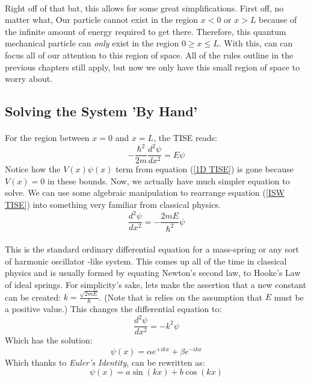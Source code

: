 \documentclass[12pt,letterpaper]{book}
\begin{document}
\paragraph*{}Right off of that bat, this allows for some great simplifications. First off, no matter what, Our particle cannot exist in the region $x < 0$ or $x > L$ because of the infinite amount of energy required to get there. Therefore, this quantum mechanical particle can \textit{only} exist in the region $0 \geq x \leq L$. With this, can can focus all of our attention to this region of space. All of the rules outline in the previous chapters still apply, but now we only have this small region of space to worry about.


\subsection*{Solving the System 'By Hand'}

\paragraph*{}For the region between $x = 0$ and $x = L$, the TISE reads:
\begin{equation}
\label{ISW TISE}
-\frac{\hbar^2}{2m}\frac{d^2 \psi}{dx^2} = E\psi
\end{equation}
Notice how the $V(x)\psi(x)$ term from equation (\ref{1D TISE}) is gone because $V(x) = 0$ in these bounds. Now, we actually have much simpler equation to solve. We can use some algebraic manipulation to rearrange equation (\ref{ISW TISE}) into something very familiar from classical physics.
\begin{equation}
\label{HO ODE}
\frac{d^2 \psi}{dx^2} = -\frac{2mE}{\hbar^2}\psi
\end{equation}
\paragraph{}This is the standard ordinary differential equation for a mass-spring or any sort of harmonic oscillator -like system. This comes up all of the time in classical physics and is usually formed by equating Newton's second law, to Hooke's Law of ideal springs.  For simplicity's sake, lets make the assertion that a new constant can be created: $k = \frac{\sqrt{2mE}}{\hbar}$. (Note that is relies on the assumption that $E$ must be a positive value.) This changes the differential equation to:
\begin{equation}
\frac{d^2 \psi}{dx^2} = -k^2\psi
\end{equation}
Which has the solution:
\begin{equation}
\psi(x) = \alpha e^{+ikx} + \beta e^{-ikx}
\end{equation}
Which thanks to \textit{Euler's Identity}, can be rewritten as:
\begin{equation}
\psi(x) = a \sin(kx) + b \cos(kx)
\end{equation}
\end{document}
